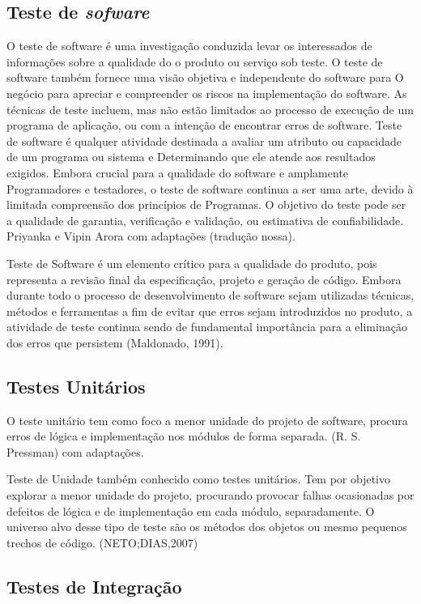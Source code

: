 \subsection{Teste de \textit{sofware}}
O teste de software é uma investigação conduzida levar os interessados de informações sobre a qualidade do o produto ou serviço sob teste. 
O teste de software também fornece uma visão objetiva e independente do software para
O negócio para apreciar e compreender os riscos na implementação do software. 
As técnicas de teste incluem, mas não estão limitados ao processo de execução de um programa de aplicação, ou com a intenção de encontrar erros de software.
 Teste de software é qualquer atividade destinada a avaliar um atributo ou capacidade de um programa ou sistema e Determinando que ele atende aos resultados exigidos. 
Embora crucial para a qualidade do software e amplamente Programadores e testadores, o teste de software continua a ser uma arte, devido à limitada compreensão dos princípios de Programas. 
 O objetivo do teste pode ser a qualidade de garantia, verificação e validação, ou estimativa de confiabilidade. 
Priyanka e Vipin Arora  com adaptações (tradução nossa).

Teste de Software é um elemento crítico para a qualidade do produto, pois representa a revisão final da especificação, projeto e geração de código. Embora durante todo o processo de desenvolvimento de software sejam utilizadas técnicas, métodos e ferramentas a fim de evitar que erros sejam introduzidos no produto, a atividade de teste continua sendo de fundamental importância para a eliminação dos erros que persistem (Maldonado, 1991).

    \subsection{Testes Unitários}
        O teste unitário tem como foco a menor unidade do projeto de software, procura erros de lógica e implementação nos módulos de forma separada. (R. S. Pressman) com adaptações.

         Teste de Unidade também conhecido como testes unitários. Tem por objetivo explorar a menor unidade do projeto, procurando provocar falhas ocasionadas por defeitos de lógica e de implementação em cada módulo, separadamente. O universo alvo desse tipo de teste são os métodos dos objetos ou mesmo pequenos trechos de código. (NETO;DIAS,2007)
        
        

    \subsection{Testes de Integração}

